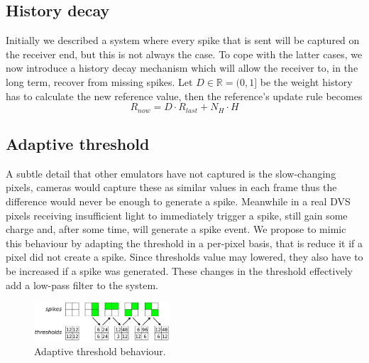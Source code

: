 \documentclass[twocolumn, a4paper]{article}
\begin{document}
\subsection{History decay} %

Initially we described a system where every spike that is sent will be captured on the receiver end, but this is not always the case. To cope with the latter cases, we now introduce a history decay mechanism which will allow the receiver to, in the long term, recover from missing spikes. Let $D \in \mathbb{R} = (0, 1]$ be the weight history has to calculate the new reference value, then the reference's update rule becomes
\begin{equation}
\label{eq:ref_update_decay}
R_{now} = D\cdot R_{last} + N_{H}\cdot H
\end{equation}

%

\subsection{Adaptive threshold} 
A subtle detail that other emulators have not captured is the slow-changing pixels, cameras would capture these as similar values in each frame thus the difference would never be enough to generate a spike. Meanwhile in a real DVS pixels receiving insufficient light to immediately trigger a spike, still gain some charge and, after some time, will generate a spike event. We propose to mimic this behaviour by adapting the threshold in a per-pixel basis, that is reduce it if a pixel did not create a spike. Since thresholds value may lowered, they also have to be increased if a spike was generated. These changes in the threshold effectively add a low-pass filter to the system. 

%
\begin{figure}
  \centering
  \includegraphics[width=0.45\textwidth]{adaptive_thresh_boxes}
  \caption{Adaptive threshold behaviour.}
  \label{fig:adpt_thresh}
\end{figure}
\end{document}
